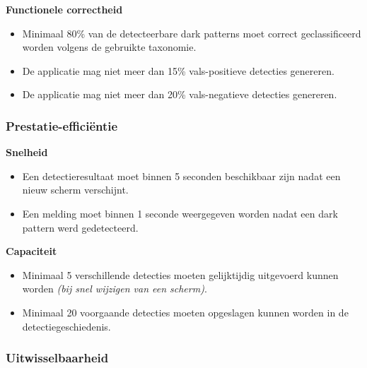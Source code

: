 \hspace*{1.5em}\textbf{Functionele correctheid}

\begin{itemize}
    \item Minimaal 80\% van de detecteerbare dark patterns moet correct geclassificeerd worden volgens de gebruikte taxonomie.
    \item De applicatie mag niet meer dan 15\% vals-positieve detecties genereren.
    \item De applicatie mag niet meer dan 20\% vals-negatieve detecties genereren.
\end{itemize}

\newpage

\subsubsection{Prestatie-efficiëntie}
\vspace{1em}

\hspace*{1.5em}\textbf{Snelheid}

\begin{itemize}
    \item Een detectieresultaat moet binnen 5 seconden beschikbaar zijn nadat een nieuw scherm verschijnt.
    \item Een melding moet binnen 1 seconde weergegeven worden nadat een dark pattern werd gedetecteerd.
\end{itemize}

\vspace{0.5em}

\hspace*{1.5em}\textbf{Capaciteit}

\begin{itemize}
    \item Minimaal 5 verschillende detecties moeten gelijktijdig uitgevoerd kunnen worden \textit{(bij snel wijzigen van een scherm)}.
    \item Minimaal 20 voorgaande detecties moeten opgeslagen kunnen worden in de detectiegeschiedenis.
\end{itemize}

\vspace{1em}

\subsubsection{Uitwisselbaarheid}
\vspace{1em}


